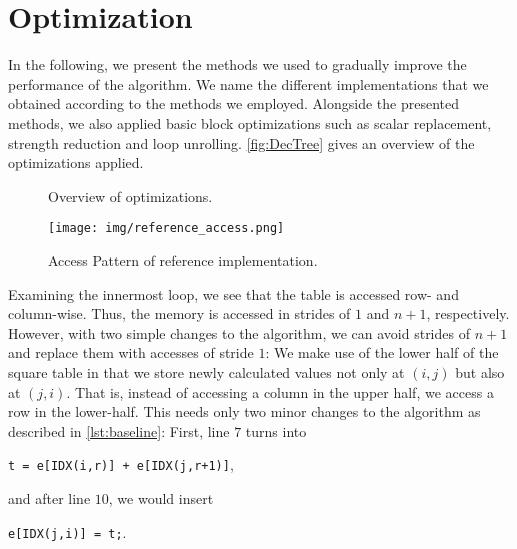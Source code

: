 \section{Optimization}
In the following, we present the methods we used to gradually improve the
performance of the algorithm. We name the different implementations that we
obtained according to the methods we employed. Alongside the presented
methods, we also applied basic block optimizations such as scalar
replacement, strength reduction and loop unrolling. \autoref{fig:DecTree}
gives an overview of the optimizations applied.

\begin{figure}[htb]

\begin{center}
\end{center}
\caption{Overview of optimizations.}
\label{fig:DecTree}
\end{figure}

\begin{figure}[htb]\centering
	\texttt{[image: img/reference\_access.png]}
  \caption{Access Pattern of reference implementation.\label{fig:reference}}
\end{figure}

 Examining the innermost loop, we see that the table is
accessed row- and column-wise. Thus, the memory is accessed in strides of $1$
and $n+1$, respectively. However, with two simple changes to the algorithm, we
can avoid strides of $n+1$ and replace them with accesses of stride $1$: We make
use of the lower half of the square table in that we store newly calculated
values not only at $(i,j)$ but also at $(j,i)$. That is, instead of accessing a
column in the upper half, we access a row in the lower-half. This needs only two
minor changes to the algorithm as described in \autoref{lst:baseline}:
First, line $7$ turns into
\begin{center}
\verb:t = e[IDX(i,r)] + e[IDX(j,r+1)]:, 
\end{center}
and after line $10$, we would insert 
\begin{center}
	\verb:e[IDX(j,i)] = t;:.
\end{center}

